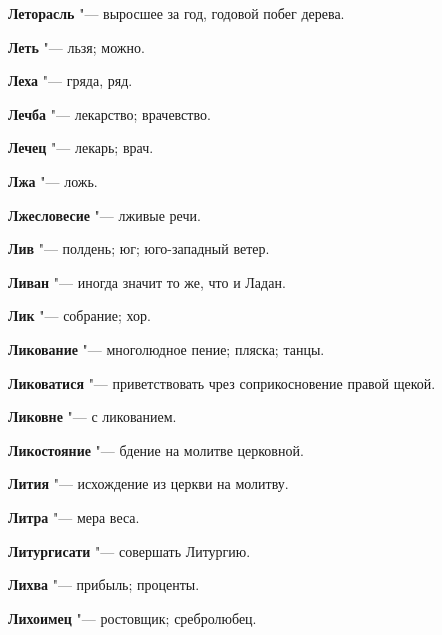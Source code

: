 \begin{mymulticols}{2}
\noindent\textbf{Леторасль} "--- выросшее за год, годовой побег дерева. 




\noindent\textbf{Леть} "--- льзя; можно. 




\noindent\textbf{Леха} "--- гряда, ряд. 




\noindent\textbf{Лечба} "--- лекарство; врачевство. 




\noindent\textbf{Лечец} "--- лекарь; врач. 




\noindent\textbf{Лжа} "--- ложь. 




\noindent\textbf{Лжесловесие} "--- лживые речи. 




\noindent\textbf{Лив} "--- полдень; юг; юго-западный ветер. 




\noindent\textbf{Ливан} "--- иногда значит то же, что и Ладан. 




\noindent\textbf{Лик} "--- собрание; хор. 




\noindent\textbf{Ликование} "--- многолюдное пение; пляска; танцы. 




\noindent\textbf{Ликоватися} "--- приветствовать чрез соприкосновение правой щекой. 




\noindent\textbf{Ликовне} "--- с ликованием. 




\noindent\textbf{Ликостояние} "--- бдение на молитве церковной. 




\noindent\textbf{Лития} "--- исхождение из церкви на молитву. 




\noindent\textbf{Литра} "--- мера веса. 




\noindent\textbf{Литургисати} "--- совершать Литургию. 




\noindent\textbf{Лихва} "--- прибыль; проценты. 




\noindent\textbf{Лихоимец} "--- ростовщик; сребролюбец. 





\end{mymulticols}
